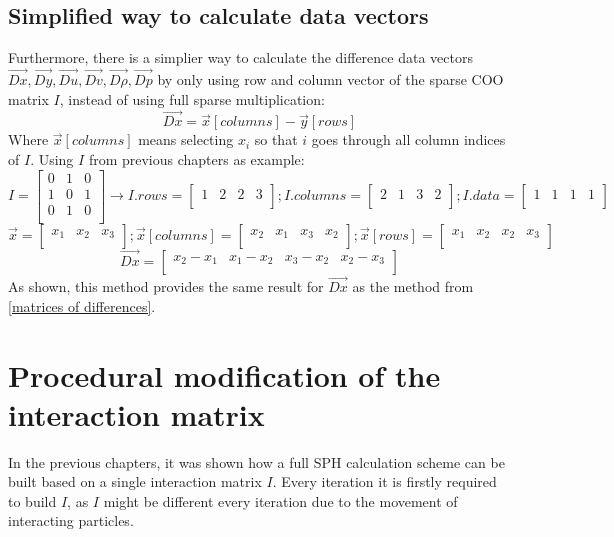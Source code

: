 \documentclass{article}
\begin{document}
\subsection{Simplified way to calculate data vectors}
Furthermore, there is a simplier way to calculate the difference data vectors $\Vec{Dx}, \Vec{Dy}, \Vec{Du}, \Vec{Dv}, \Vec{D\rho}, \Vec{Dp}$ by only using row and column vector of the sparse COO matrix $I$, instead of using full sparse multiplication:
$$\Vec{Dx} = \Vec{x}[columns]-\Vec{y}[rows] $$
Where $\Vec{x}[columns]$ means selecting $x_i$ so that $i$ goes through all column indices of $I$. Using $I$ from previous chapters as example:
$$I = 
\begin{bmatrix}
0 & 1 & 0\\
1 & 0 & 1\\
0 & 1 & 0\\
\end{bmatrix}
\to I.rows = 
\begin{bmatrix}
1 & 2 & 2 & 3\\
\end{bmatrix}
; I.columns = 
\begin{bmatrix}
2 & 1 & 3 & 2\\
\end{bmatrix}
; I.data = 
\begin{bmatrix}
1 & 1 & 1 & 1\\
\end{bmatrix}
$$
$$
\vec{x}=
\begin{bmatrix}
x_1 & x_2 & x_3\\
\end{bmatrix}
; 
\vec{x}[columns]=
\begin{bmatrix}
x_2 & x_1 & x_3 & x_2\\
\end{bmatrix}
; 
\vec{x}[rows]=
\begin{bmatrix}
x_1 & x_2 & x_2 & x_3\\
\end{bmatrix}
$$
$$
\Vec{Dx} = 
\begin{bmatrix}
x_2-x_1 & x_1-x_2 & x_3-x_2 & x_2-x_3\\
\end{bmatrix}
$$
As shown, this method provides the same result for $\Vec{Dx}$ as the method from \ref{matrices of differences}.

\section{Procedural modification of the interaction matrix}
In the previous chapters, it was shown how a full SPH calculation scheme can be built based on a single interaction matrix $I$. Every iteration it is firstly required to build $I$, as $I$ might be different every iteration due to the movement of interacting particles.
\end{document}
